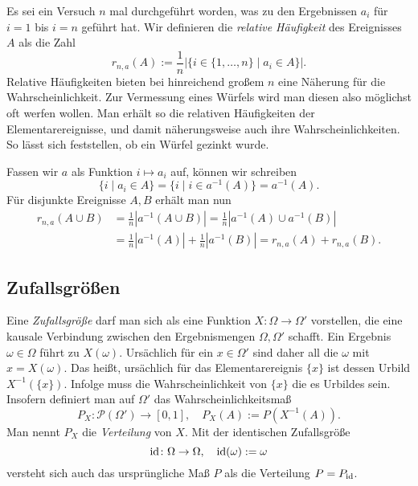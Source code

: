 Es sei ein Versuch $n$ mal durchgeführt worden, was zu den Ergebnissen
$a_i$ für $i=1$ bis $i=n$ geführt hat. Wir definieren die \emph{relative
Häufigkeit} des Ereignisses $A$ als die Zahl
\[r_{n,a}(A) := \frac{1}{n}|\{i\in\{1,\ldots,n\}\mid a_i\in A\}|.\]
Relative Häufigkeiten bieten bei hinreichend großem $n$ eine Näherung
für die Wahrscheinlichkeit. Zur Vermessung eines Würfels wird man
diesen also möglichst oft werfen wollen. Man erhält so die relativen
Häufigkeiten der Elementarereignisse, und damit näherungsweise auch
ihre Wahrscheinlichkeiten. So lässt sich feststellen, ob ein
Würfel gezinkt wurde.

Fassen wir $a$ als Funktion $i\mapsto a_i$ auf, können wir schreiben
\[\{i\mid a_i\in A\} = \{i\mid i\in a^{-1}(A)\} = a^{-1}(A).\]
Für disjunkte Ereignisse $A,B$ erhält man nun
\begin{align*}
r_{n,a}(A\cup B) &= \tfrac{1}{n}|a^{-1}(A\cup B)|
= \tfrac{1}{n}|a^{-1}(A)\cup a^{-1}(B)|\\
&= \tfrac{1}{n}|a^{-1}(A)| + \tfrac{1}{n}|a^{-1}(B)|
= r_{n,a}(A) + r_{n,a}(B).
\end{align*}

\subsection{Zufallsgrößen}

Eine \emph{Zufallsgröße} darf man
sich als eine Funktion $X\colon\Omega\to\Omega'$
vorstellen, die eine kausale Verbindung zwischen den Ergebnismengen
$\Omega,\Omega'$ schafft. Ein Ergebnis $\omega\in\Omega$ führt
zu $X(\omega)$. Ursächlich für ein $x\in\Omega'$ sind daher all die
$\omega$ mit $x=X(\omega)$. Das heißt, ursächlich für das
Elementarereignis $\{x\}$ ist dessen Urbild $X^{-1}(\{x\})$.
Infolge muss die Wahrscheinlichkeit von $\{x\}$ die es Urbildes sein.
Insofern definiert man auf $\Omega'$ das Wahrscheinlichkeitsmaß%
\[P_X\colon\mathcal P(\Omega')\to [0,1],\quad P_X(A) := P(X^{-1}(A)).\]
Man nennt $P_X$ die \emph{Verteilung} von $X$. Mit der
identischen Zufallsgröße
\[\operatorname{id}\colon\Omega\to\Omega,\quad \operatorname{id}(\omega) := \omega\]
versteht sich auch das ursprüngliche Maß $P$ als die Verteilung $P=P_{\operatorname{id}}$.

